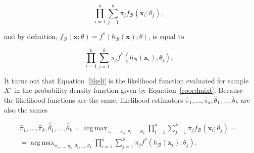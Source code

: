 \documentclass[10pt, a4paper]{article}
\DeclareMathOperator*{\argmax}{arg\,max}
\begin{document}
\begin{equation}
\prod_{i=1}^n \sum_{j=1}^k \pi_j f_\mathcal{B}(\textbf{x}_i; \theta_j),
\end{equation}

and by definition, $f_\mathcal{B}(\textbf{x} ; \theta) = f^*(h_\mathcal{B}(\textbf{x}) ; \theta)$, is equal to 

\begin{equation}\label{likeli}
\prod_{i=1}^n \sum_{j=1}^k \pi_j f^*(h_\mathcal{B}(\textbf{x}_i); \theta_j).
\end{equation}

It turns out that Equation~\ref{likeli} is the likelihood function evaluated for sample $X'$ in the probability density function given by Equation~\ref{coordmixt}. Because the likelihood functions are the same, likelihood estimators $\hat{\pi}_1, \dots, \hat{\pi}_k, \hat{\theta}_1, \dots, \hat{\theta}_k$ are also the sames

\begin{eqnarray}
\hat{\pi}_1, \dots, \hat{\pi}_k, \hat{\theta}_1, \dots, \hat{\theta}_k = \argmax_{\pi_1, \dots, \pi_k, \theta_1, \dots, \theta_k} \prod_{i=1}^n \sum_{j=1}^k \pi_j f_\mathcal{B}(\textbf{x}_i; \theta_j) = \\ 
= \argmax_{\pi_1, \dots, \pi_k, \theta_1, \dots, \theta_k} \prod_{i=1}^n \sum_{j=1}^k \pi_j f^*(h_\mathcal{B}(\textbf{x}_i); \theta_j).
\end{eqnarray}

% 
\end{document}
